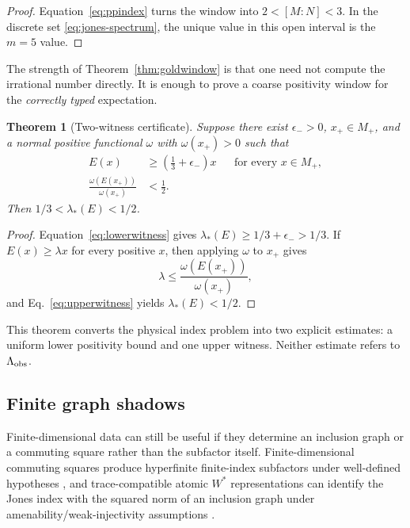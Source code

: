 \documentclass[aps,prd,preprint,nofootinbib,superscriptaddress]{revtex4-2}
\newtheorem{theorem}{Theorem}[section]
\theoremstyle{definition}
\theoremstyle{remark}
\newcommand{\PP}{\lambda_*}
\begin{document}
\begin{proof}
Equation~\eqref{eq:ppindex} turns the window into $2<[M:N]<3$.  In the discrete set \eqref{eq:jones-spectrum}, the unique value in this open interval is the $m=5$ value.
\end{proof}

The strength of Theorem~\ref{thm:goldwindow} is that one need not compute the irrational number directly.  It is enough to prove a coarse positivity window for the \emph{correctly typed} expectation.

\begin{theorem}[Two-witness certificate]
\label{thm:twowitness}
Suppose there exist $\epsilon_->0$, $x_+\in M_+$, and a normal positive functional $\omega$ with $\omega(x_+)>0$ such that
\begin{align}
E(x)&\ge\left(\frac13+\epsilon_-\right)x
&&\text{for every }x\in M_+,
\label{eq:lowerwitness}
\\
\frac{\omega(E(x_+))}{\omega(x_+)}
&<\frac12.
\label{eq:upperwitness}
\end{align}
Then $1/3<\PP(E)<1/2$.
\end{theorem}

\begin{proof}
Equation~\eqref{eq:lowerwitness} gives $\PP(E)\ge1/3+\epsilon_->1/3$.  If $E(x)\ge\lambda x$ for every positive $x$, then applying $\omega$ to $x_+$ gives
\begin{equation}
\lambda\le
\frac{\omega(E(x_+))}{\omega(x_+)},
\end{equation}
and Eq.~\eqref{eq:upperwitness} yields $\PP(E)<1/2$.
\end{proof}

This theorem converts the physical index problem into two explicit estimates: a uniform lower positivity bound and one upper witness.  Neither estimate refers to $\Lambda_{\rm obs}$.

\subsection{Finite graph shadows}

Finite-dimensional data can still be useful if they determine an inclusion graph or a commuting square rather than the subfactor itself.  Finite-dimensional commuting squares produce hyperfinite finite-index subfactors under well-defined hypotheses \cite{Kawahigashi2023}, and trace-compatible atomic $W^*$ representations can identify the Jones index with the squared norm of an inclusion graph under amenability/weak-injectivity assumptions \cite{Popa2023}.
\end{document}
